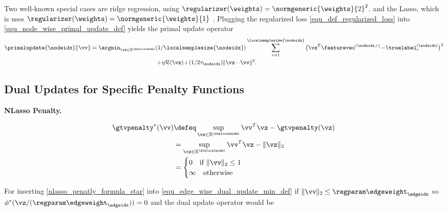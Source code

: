 \documentclass[lettersize,journal]{IEEEtran}
\begin{document}
Two well-known special cases are ridge regression, using $\regularizer(\weights) = \normgeneric{\weights}{2}^{2}$.  
and the Lasso, which is uses $\regularizer(\weights) = \normgeneric{\weights}{1}$ \cite{HastieWainwrightBook}. 
Plugging the regularized loss \eqref{equ_def_regularized_loss} into \eqref{equ_node_wise_primal_update_def} 
yields the primal update operator 
\begin{align}
\label{regularized_reg_eq}
\primalupdate{\nodeidx}{\vv} =\argmin_{\vz \in \mathbb{R}^{\dimlocalmodel}} &(1/\localsamplesize{\nodeidx}) \sum_{r=1}^{\localsamplesize{\nodeidx}} \big( \vz^{T} \featurevec^{(\nodeidx,r)}\!-\!\truelabel_{r}^{(\nodeidx)} \big)^2\! \nonumber \\
 & + \!\eta \mathcal{R}(\vz)\!+ \!(1/2\tau_{\nodeidx}) \| \vz\!-\!\vv \|^2.
\end{align}




\subsection{Dual Updates for Specific Penalty Functions}
\label{ref_penalty_some_special_cases}

{\bf NLasso Penalty.} %

\begin{align} 
\label{nlasso_penatly_formula_star}
\gtvpenalty^{*}(\vv) &{\defeq  \sup_{\vz \in \mathbb{R}^{\dimlocalmodel}} \vv^{T}\vz - \gtvpenalty(\vz) }
\nonumber \\
& =  \sup_{\vz \in \mathbb{R}^{\dimlocalmodel}} \vv^{T}\vz - \|\vz\|_2
\nonumber \\
& = \begin{cases}
        0 \quad \text{if\ } \|\vv\|_2 \leq 1 \\
        \infty \quad \text{otherwise}
     \end{cases}
\nonumber \\
\end{align} 

For inserting \ref{nlasso_penatly_formula_star} into \ref{equ_edge_wise_dual_update_min_def} if 
$\|\vv\|_2 \leq \regparam \edgeweight_{\edgeidx} $ so $\phi^{*}(\vz/(\regparam \edgeweight_{\edgeidx})) = 0$ and the dual update operator would be
\end{document}
